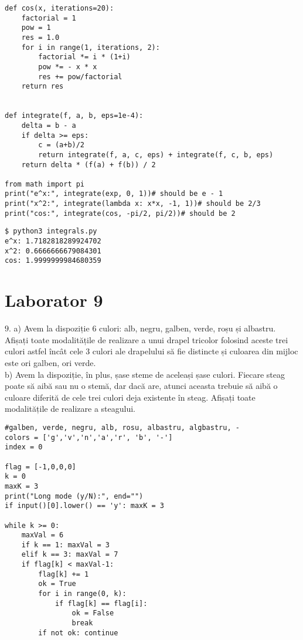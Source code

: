 \documentclass[11pt]{article}
\begin{document}
\begin{itemize}
\begin{itemize}
\begin{verbatim}
def cos(x, iterations=20):
    factorial = 1
    pow = 1
    res = 1.0
    for i in range(1, iterations, 2):
        factorial *= i * (1+i)
        pow *= - x * x
        res += pow/factorial
    return res


def integrate(f, a, b, eps=1e-4):
    delta = b - a
    if delta >= eps: 
        c = (a+b)/2
        return integrate(f, a, c, eps) + integrate(f, c, b, eps)
    return delta * (f(a) + f(b)) / 2

from math import pi
print("e^x:", integrate(exp, 0, 1))# should be e - 1
print("x^2:", integrate(lambda x: x*x, -1, 1))# should be 2/3
print("cos:", integrate(cos, -pi/2, pi/2))# should be 2
\end{verbatim}

\begin{verbatim}
$ python3 integrals.py
e^x: 1.7182818289924702
x^2: 0.6666666679084301
cos: 1.9999999984680359

\end{verbatim}


\pagebreak

\section*{Laborator 9}
\label{sec:org6f85904}

\(9\). a) Avem la dispoziție 6 culori: alb, negru, galben, verde, roșu și albastru. Afișați toate modalitățile de realizare a unui drapel tricolor folosind aceste trei culori astfel încât cele 3 culori ale drapelului să fie distincte și culoarea din mijloc este ori galben, ori verde.\\
b) Avem la dispoziție, în plus, șase steme de aceleași șase culori. Fiecare steag poate să aibă sau nu o stemă, dar dacă are, atunci aceasta trebuie să aibă o culoare diferită de cele trei culori deja existente în steag. Afișați toate modalitățile de realizare a steagului.

\begin{verbatim}
#galben, verde, negru, alb, rosu, albastru, algbastru, -
colors = ['g','v','n','a','r', 'b', '-']
index = 0

flag = [-1,0,0,0]
k = 0
maxK = 3
print("Long mode (y/N):", end="")
if input()[0].lower() == 'y': maxK = 3

while k >= 0:
    maxVal = 6
    if k == 1: maxVal = 3
    elif k == 3: maxVal = 7
    if flag[k] < maxVal-1:
        flag[k] += 1
        ok = True
        for i in range(0, k):
            if flag[k] == flag[i]: 
                ok = False
                break
        if not ok: continue


\end{verbatim}
\end{itemize}
\end{itemize}
\end{document}
